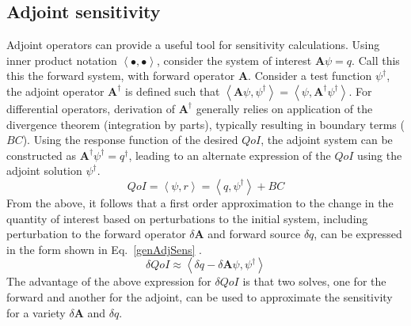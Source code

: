 \documentclass{article}
\newcommand{\bra}{\left\langle}
\newcommand{\ket}{\right\rangle}
\newcommand{\qoi}{QoI}
\begin{document}
\subsection{Adjoint sensitivity}

Adjoint operators can provide a useful tool for sensitivity calculations. Using inner product notation $\bra \bullet , \bullet \ket$, consider the system of interest $\mathbf{A} \psi = q$. Call this this the forward system, with forward operator $\mathbf{A}$. Consider a test function $\psi^\dag$, the adjoint operator $\mathbf{A^\dag}$ is defined such that $\bra \mathbf{A} \psi, \psi^\dag \ket = \bra \psi, \mathbf{A^\dag} \psi^\dag \ket $. For differential operators, derivation of $\mathbf{A^\dag}$ generally relies on application of the divergence theorem (integration by parts), typically resulting in boundary terms ($BC$). Using the response function of the desired $\qoi$, the adjoint system can be constructed as $\mathbf{A^\dag} \psi^\dag = q^\dag$, leading to an alternate expression of the $\qoi$ using the adjoint solution $\psi^\dag $.
\begin{equation}
\label{genAdjQoI}
\qoi = \bra \psi, r \ket = \bra q , \psi^\dag \ket + BC
\end{equation} 
From the above, it follows that a first order approximation to the change in the quantity of interest based on perturbations to the initial system, including perturbation to the forward operator $\delta \mathbf{A}$ and forward source $\delta q$, can be expressed in the form shown in Eq.~\eqref{genAdjSens} \cite{Marchuk}.
\begin{equation}
\label{genAdjSens}
\delta \qoi \approx \bra \delta q - \delta \mathbf{A} \psi , \psi^\dag \ket 
\end{equation}
The advantage of the above expression for $\delta \qoi$ is that two solves, one for the forward and another for the adjoint, can be used to approximate the sensitivity for a variety $\delta \mathbf{A}$ and $\delta q$.

 
\end{document}
